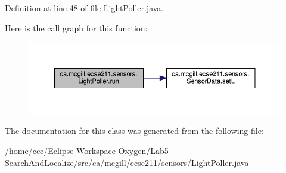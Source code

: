 Definition at line 48 of file Light\+Poller.\+java.

Here is the call graph for this function\+:\nopagebreak
\begin{figure}[H]
\begin{center}
\leavevmode
\includegraphics[width=350pt]{classca_1_1mcgill_1_1ecse211_1_1sensors_1_1_light_poller_a31751b40132d9402de493aa9ec11d9d5_cgraph}
\end{center}
\end{figure}


The documentation for this class was generated from the following file\+:\begin{DoxyCompactItemize}
\item 
/home/ccc/\+Eclipse-\/\+Workspace-\/\+Oxygen/\+Lab5-\/\+Search\+And\+Localize/src/ca/mcgill/ecse211/sensors/Light\+Poller.\+java\end{DoxyCompactItemize}
